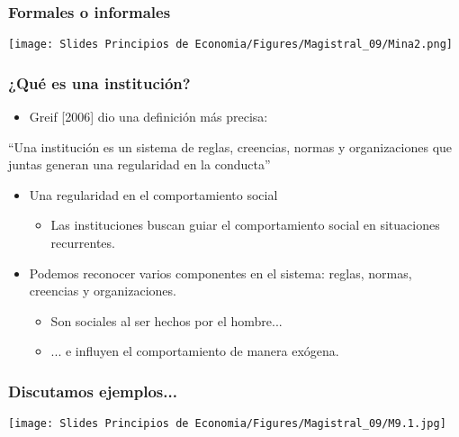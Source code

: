\documentclass{beamer}
\begin{document}
\begin{frame}
\frametitle{Formales o informales}
\centering
\texttt{[image: Slides Principios de Economia/Figures/Magistral\_09/Mina2.png]}
\end{frame}


\begin{frame}
\frametitle{¿Qué es una institución?}
\begin{itemize}
    \item Greif [2006] dio una definición más precisa:
    \end{itemize}
     \begin{boxB}
     ``Una institución es un sistema de reglas, creencias, normas y organizaciones que juntas generan una regularidad en la conducta''
     \end{boxB}
\vspace{2mm}
\begin{itemize}
    \item Una regularidad en el comportamiento social 
    \begin{itemize}
        \item Las instituciones buscan guiar el comportamiento social en situaciones recurrentes. \vspace{2mm}
    \end{itemize}
    \item Podemos reconocer varios componentes en el sistema: reglas, normas, creencias y organizaciones. 
    \begin{itemize}
        \item Son sociales al ser hechos por el hombre...
        \item ... e influyen el comportamiento de manera exógena.
    \end{itemize}
\end{itemize} 
\end{frame}

\begin{frame}
\frametitle{Discutamos ejemplos...}
\centering
\texttt{[image: Slides Principios de Economia/Figures/Magistral\_09/M9.1.jpg]}
\end{frame}
\end{document}
